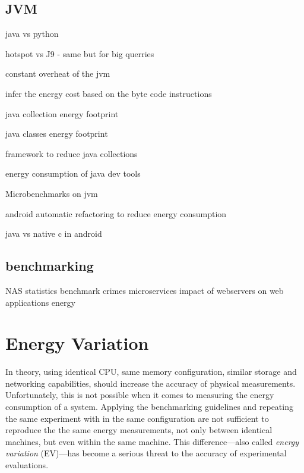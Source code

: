 \subsection{JVM}

java vs python \cite{destefanis_statistical_2016}

hotspot vs J9 \cite{oi2011power} - same but for big querries \cite{chiba2018towards}

constant overheat of the jvm \cite{lafond2006energy}

infer the energy cost based on the byte code instructions \cite{ma2017biogeography}

java collection energy footprint  \cite{pinto2016comprehensive} \cite{fernandes2017assisting}

java classes energy footprint \cite{hasan2016energy}

framework to reduce java collections \cite{manotas2014seeds}

energy consumption of java dev tools \cite{baskar2013experimental}

Microbenchmarks on jvm \cite{longo2019reducing} \cite{baskar2013experimental}

android automatic refactoring to reduce energy consumption \cite{banerjee2016automated} \cite{rodriguez2017reducing}

java vs native c in android \cite{corral2014method}





\subsection{benchmarking}
NAS \cite{bailey_nas_nodate}
statistics \cite{he_statistics-based_2019}
benchmark crimes \cite{van_der_kouwe_benchmarking_2018}
microservices \cite{grambow_benchmarking_2020}
impact of webservers on web applications energy \cite{manotas_investigating_2013}

\section{Energy Variation}\label{sec:energy_variation}
In theory, using identical CPU, same memory configuration, similar storage and networking capabilities, should increase the accuracy of physical measurements.
Unfortunately, this is not possible when it comes to measuring the energy consumption of a system.
Applying the benchmarking guidelines and repeating the same experiment with in the same configuration are not sufficient to reproduce the the same energy measurements, not only between identical machines, but even within the same machine.
This difference---also called \emph{energy variation} (EV)---has become a serious threat to the accuracy of experimental evaluations.


